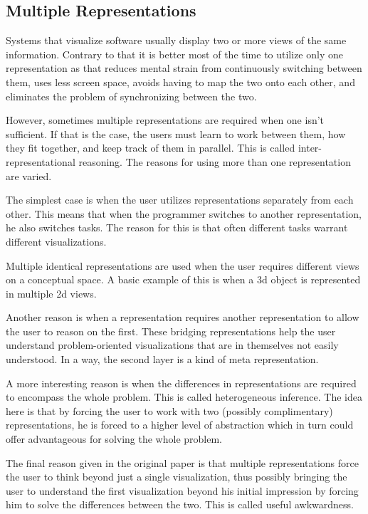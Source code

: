 \documentclass[11pt, a4paper, ngerman, twoside]{article}
\theoremstyle{plain}\newtheorem{Lemma}{Lemma}
\theoremstyle{plain}\newtheorem{Satz}[Lemma]{Satz}
\theoremstyle{definition}\newtheorem{Definition}[Lemma]{Definition}
\theoremstyle{definition}\newtheorem*{Beispiel}{Beispiel}
\theoremstyle{remark}\newtheorem*{Bemerkung}{Bemerkung}
\begin{document}
\subsection{Multiple Representations}

Systems that visualize software usually display two or more views of the same information. Contrary to that it is better most of the time to utilize only one representation as that reduces mental strain from continuously switching between them, uses less screen space, avoids having to map the two onto each other, and eliminates the problem of synchronizing between the two.

However, sometimes multiple representations are required when one isn't sufficient. If that is the case, the users must learn to work between them, how they fit together, and keep track of them in parallel. This is called inter-representational reasoning. The reasons for using more than one representation are varied.

The simplest case is when the user utilizes representations separately from each other. This means that when the programmer switches to another representation, he also switches tasks. The reason for this is that often different tasks warrant different visualizations.

Multiple identical representations are used when the user requires different views on a conceptual space. A basic example of this is when a 3d object is represented in multiple 2d views.

Another reason is when a representation requires another representation to allow the user to reason on the first. These bridging representations help the user understand problem-oriented visualizations that are in themselves not easily understood. In a way, the second layer is a kind of meta representation.

A more interesting reason is when the differences in representations are required to encompass the whole problem. This is called heterogeneous inference. The idea here is that by forcing the user to work with two (possibly complimentary) representations, he is forced to a higher level of abstraction which in turn could offer advantageous for solving the whole problem.

The final reason given in the original paper is that multiple representations force the user to think beyond just a single visualization, thus possibly bringing the user to understand the first visualization beyond his initial impression by forcing him to solve the differences between the two. This is called useful awkwardness.
\end{document}
